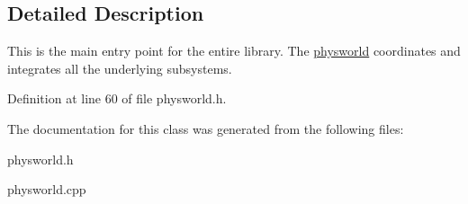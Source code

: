 \subsection{Detailed Description}
This is the main entry point for the entire library. The \hyperlink{classphysworld}{physworld} coordinates and integrates all the underlying subsystems. 

Definition at line 60 of file physworld.h.

The documentation for this class was generated from the following files:\begin{DoxyCompactItemize}
\item 
physworld.h\item 
physworld.cpp\end{DoxyCompactItemize}
